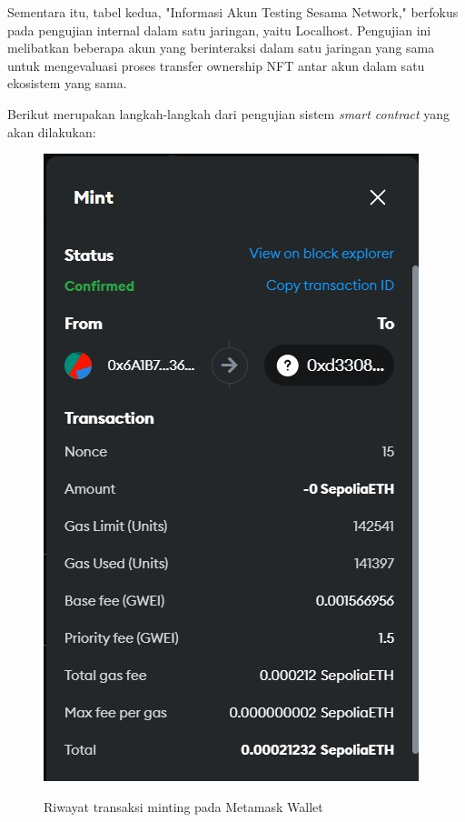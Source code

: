   Sementara itu, tabel kedua, "Informasi Akun Testing Sesama Network," berfokus pada pengujian internal dalam satu jaringan, yaitu Localhost. Pengujian ini melibatkan beberapa akun yang berinteraksi dalam satu jaringan yang sama untuk mengevaluasi proses transfer ownership NFT antar akun dalam satu ekosistem yang sama.

  Berikut merupakan langkah-langkah dari pengujian sistem \emph{smart contract} yang akan dilakukan:

\begin{itemize}
    \begin{figure} [H] \centering
    \emph{\includegraphics[scale=0.35]{gambar/riwayat_transaksi.jpeg}}
    \caption{Riwayat transaksi minting pada Metamask Wallet}
    \label{fig:minting}
    \end{figure}


\end{itemize}
